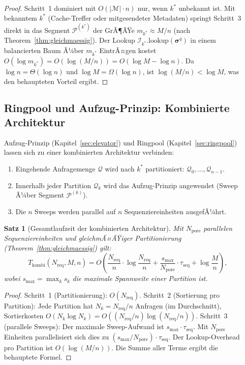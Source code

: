 ﻿\documentclass[a4paper,12pt]{article}
\theoremstyle{definition}
\theoremstyle{plain}
\newtheorem{satz}{Satz}[section]
\begin{document}
\begin{proof}
  Schritt~1 dominiert mit $O(|\mathcal{M}| \cdot n)$ nur, wenn $k^*$
  unbekannt ist.  Mit bekanntem $k^*$ (Cache-Treffer oder mitgesendeter
  Metadaten) springt Schritt~3 direkt in das Segment $\mathcal{P}^{(k^*)}$
  der GrÃ¶ÃŸe $m_{k^*} \approx M/n$ (nach Theorem~\ref{thm:gleichmaessig}).
  Der Lookup $\mathcal{I}_{k^*}.\mathrm{lookup}(\boldsymbol{\sigma}^q)$
  in einem balancierten Baum Ã¼ber $m_{k^*}$ EintrÃ¤gen kostet
  $O(\log m_{k^*}) = O(\log(M/n)) = O(\log M - \log n)$.
  Da $\log n = \Theta(\log n)$ und $\log M = \Omega(\log n)$, ist
  $\log(M/n) < \log M$, was den behaupteten Vorteil ergibt. 
\end{proof}

\subsection{Ringpool und Aufzug-Prinzip: Kombinierte Architektur}
\label{ssec:ring_elevator}

Aufzug-Prinzip (Kapitel~\ref{sec:elevator}) und Ringpool
(Kapitel~\ref{sec:ringpool}) lassen sich zu einer kombinierten
Architektur verbinden:

\begin{enumerate}
  \item Eingehende Anfragemenge $\mathcal{Q}$ wird nach $k^*$ partitioniert:
        $\mathcal{Q}_0, \ldots, \mathcal{Q}_{n-1}$.
  \item Innerhalb jeder Partition $\mathcal{Q}_k$ wird das Aufzug-Prinzip
        angewendet (Sweep Ã¼ber Segment $\mathcal{P}^{(k)}$).
  \item Die $n$ Sweeps werden parallel auf $n$ Sequenziereinheiten
        ausgefÃ¼hrt.
\end{enumerate}

\begin{satz}[Gesamtlaufzeit der kombinierten Architektur]
\label{satz:ring_elevator}
  Mit $N_{\mathrm{pore}}$ parallelen Sequenziereinheiten und
  gleichmÃ¤ÃŸiger Partitionierung (Theorem~\ref{thm:gleichmaessig}) gilt:
  \[
    T_{\mathrm{kombi}}(N_{\mathrm{req}}, M, n)
    = O\!\left(\frac{N_{\mathrm{req}}}{n} \cdot \log \frac{N_{\mathrm{req}}}{n}
      + \frac{s_{\max}}{N_{\mathrm{pore}}} \cdot \tau_{\mathrm{seq}}
      + \log \frac{M}{n}\right),
  \]
  wobei $s_{\max} = \max_k s_k$ die maximale Spannweite einer Partition ist.
\end{satz}

\begin{proof}
  Schritt~1 (Partitionierung): $O(N_{\mathrm{req}})$.
  Schritt~2 (Sortierung pro Partition): Jede Partition hat
  $N_k = N_{\mathrm{req}}/n$ Anfragen (im Durchschnitt),
  Sortierkosten $O(N_k \log N_k) = O((N_{\mathrm{req}}/n)\log(N_{\mathrm{req}}/n))$.
  Schritt~3 (parallele Sweeps): Der maximale Sweep-Aufwand ist
  $s_{\max} \cdot \tau_{\mathrm{seq}}$.  Mit $N_{\mathrm{pore}}$ Einheiten
  parallelisiert sich dies zu $(s_{\max}/N_{\mathrm{pore}}) \cdot \tau_{\mathrm{seq}}$.
  Der Lookup-Overhead pro Partition ist $O(\log(M/n))$.
  Die Summe aller Terme ergibt die behauptete Formel. 
\end{proof}
\end{document}
